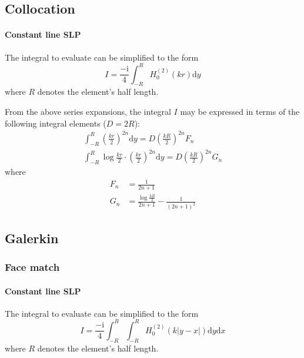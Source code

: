 \documentclass[a4paper,11pt]{article}
\newcommand{\td}{\mathrm{d}}
\newcommand{\ti}{\mathrm{i}}
\begin{document}
\subsection{Collocation}

\paragraph{Constant line SLP}

The integral to evaluate can be simplified to the form
%
\begin{equation}
I = \frac{-\ti}{4} \int_{-R}^R  H_0^{(2)}(kr)  \td y
\end{equation}
%
where $R$ denotes the element's half length.

From the above series expansions, the integral $I$ may be expressed in terms of the following integral elements ($D = 2R$):
%
\begin{align}
\int_{-R}^R
\left(\frac{kr}{2}\right)^{2n} \td y
= D \left( \frac{kR}{2} \right)^{2n} F_n \\
\int_{-R}^R
\log \frac{kr}{2} \cdot \left(\frac{kr}{2}\right)^{2n} \td y
= D \left(\frac{kR}{2}\right)^{2 n} G_n
\end{align}
%
where
%
\begin{align}
F_n &= \frac{1}{2n+1} \\
G_n &= \frac{\log\frac{kR}{2}} {2 n + 1} - \frac{1}{(2 n + 1)^2}
\end{align}


\subsection{Galerkin}

\subsubsection{Face match}

\paragraph{Constant line SLP}

The integral to evaluate can be simplified to the form
%
\begin{equation}
I = \frac{-\ti}{4} \int_{-R}^{R} \int_{-R}^R  H_0^{(2)}(k|y-x|)  \td y \td x
\end{equation}
%
where $R$ denotes the element's half length.
\end{document}
